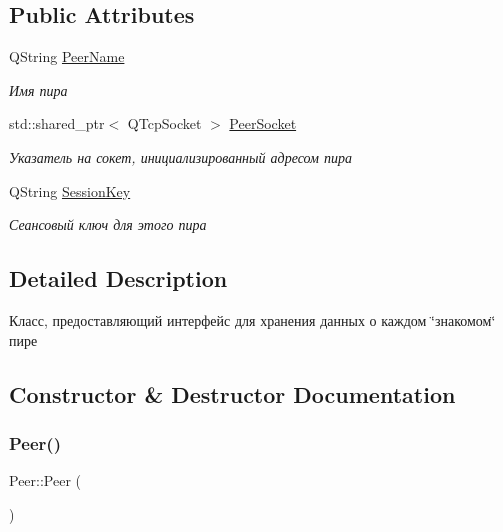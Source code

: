 \subsection*{Public Attributes}
\begin{DoxyCompactItemize}
\item 
Q\+String \hyperlink{class_peer_a1b31ac7becfb809b03d1926bf5507f6f}{Peer\+Name}
\begin{DoxyCompactList}\small\item\em Имя пира \end{DoxyCompactList}\item 
std\+::shared\+\_\+ptr$<$ Q\+Tcp\+Socket $>$ \hyperlink{class_peer_aaf19f96ad1374f7381ed51baa7f00b77}{Peer\+Socket}
\begin{DoxyCompactList}\small\item\em Указатель на сокет, инициализированный адресом пира \end{DoxyCompactList}\item 
Q\+String \hyperlink{class_peer_a6d280927dbdbc71827fa03cea40b78a5}{Session\+Key}
\begin{DoxyCompactList}\small\item\em Сеансовый ключ для этого пира \end{DoxyCompactList}\end{DoxyCompactItemize}


\subsection{Detailed Description}
Класс, предоставляющий интерфейс для хранения данных о каждом \char`\"{}знакомом\char`\"{} пире 

\subsection{Constructor \& Destructor Documentation}
\mbox{\label{class_peer_a9649fd34528cb532cded43d84a163371}} 
\subsubsection{\texorpdfstring{Peer()}{Peer()}\hspace{0.1cm}{\footnotesize\ttfamily [1/3]}}
{\footnotesize\ttfamily Peer\+::\+Peer (\begin{DoxyParamCaption}{ }\end{DoxyParamCaption})}



